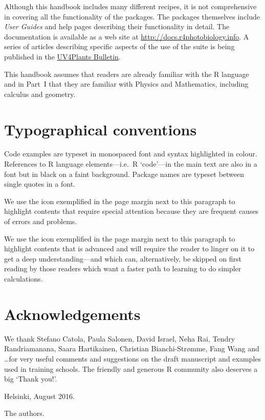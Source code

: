 Although this handbook includes many different recipes, it is not comprehensive in covering all the functionality of the packages. The packages themselves include \emph{User Guides} and help pages describing their functionality in detail. The documentation is available as a web site at \url{http://docs.r4photobiology.info}. A series of articles describing specific aspects of the use of the suite is being published in the \href{http://uv4plants.org/publications/uv4plants-bulletin-published-issues/}{UV4Plants Bulletin}.

This handbook assumes that readers are already familiar with the R language and in Part~I that they are familiar with Physics and Mathematics, including calculus and geometry.

\section{Typographical conventions}

Code examples are typeset in monospaced font and syntax highlighted in colour. References to R language elements---i.e.\ R `code'---in the main text are also in a  font but in black on a faint background. Package names are typeset between single quotes in a  font.

We\Attention{} use the icon exemplified in the page margin next to this paragraph to highlight contents that require special attention because they are frequent causes of errors and problems.

We\Advanced{} use the icon exemplified in the page margin next to this paragraph to highlight contents that is advanced and will require the reader to linger on it to get a deep understanding---and which can, alternatively, be skipped on first reading by those readers which want a faster path to learning to do simpler calculations.

\section{Acknowledgements}

We thank Stefano Catola, Paula Salonen, David Israel, Neha Rai, Tendry Randriamanana, Saara Hartikainen, Christian Bianchi-Str{\o}mme, Fang Wang and \ldots for very useful comments and suggestions on the draft manuscript and examples used in training schools. The friendly and generous R community also deserves a big `Thank you!'.

Helsinki, August 2016.

The authors. 